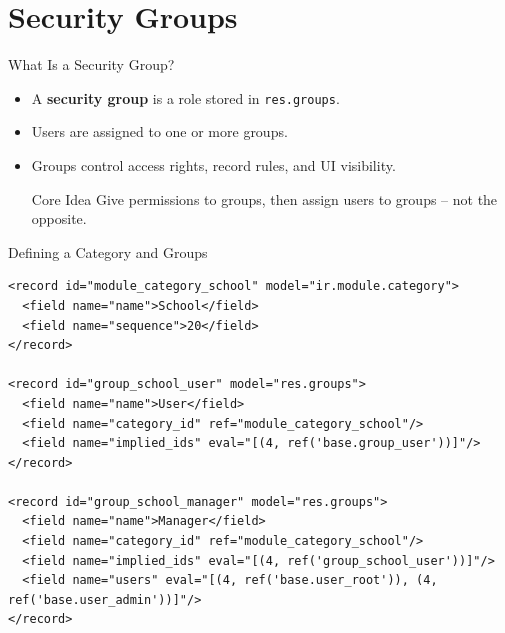 \section{Security Groups}


\begin{frame}[fragile]{What Is a Security Group?}
	\begin{itemize}
		\item A \textbf{security group} is a role stored in \texttt{res.groups}.
		\item Users are assigned to one or more groups.
		\item Groups control access rights, record rules, and UI visibility.
\begin{block}{Core Idea}
	Give permissions to groups, then assign users to groups -- not the opposite.
\end{block}
	\end{itemize}
\end{frame}

\begin{frame}[fragile]{Defining a Category and Groups}
\begin{lstlisting}[style=xml]
<record id="module_category_school" model="ir.module.category">
  <field name="name">School</field>
  <field name="sequence">20</field>
</record>

<record id="group_school_user" model="res.groups">
  <field name="name">User</field>
  <field name="category_id" ref="module_category_school"/>
  <field name="implied_ids" eval="[(4, ref('base.group_user'))]"/>
</record>

<record id="group_school_manager" model="res.groups">
  <field name="name">Manager</field>
  <field name="category_id" ref="module_category_school"/>
  <field name="implied_ids" eval="[(4, ref('group_school_user'))]"/>
  <field name="users" eval="[(4, ref('base.user_root')), (4, ref('base.user_admin'))]"/>
</record>
\end{lstlisting}
\end{frame}

